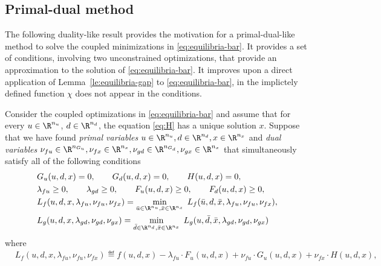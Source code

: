 \documentclass[11pt]{article}
\begin{document}
\subsection{Primal-dual method}

The following duality-like result provides the motivation for a
primal-dual-like method to solve the coupled minimizations in
\eqref{eq:equilibria-bar}. It provides a set of conditions, involving
two unconstrained optimizations, that provide an approximation to the
solution of \eqref{eq:equilibria-bar}. It improves upon a direct
application of Lemma~\ref{le:equilibria-gap} to
\eqref{eq:equilibria-bar}, in the implictely defined function $\chi$ does
not appear in the conditions.



\begin{corollary}\label{co:equilibria-gap}
  Consider the coupled optimizations in \eqref{eq:equilibria-bar} and
  assume that for every $u\in\R^{n_u}$, $d\in\R^{n_d}$, the equation
  \eqref{eq:H} has a unique solution $x$.  Suppose that we have found
  \emph{primal variables} $u\in\R^{n_u},d\in\R^{n_d},
  x\in\R^{n_x}$ and \emph{dual variables}
  $\nu_{fu}\in\R^{n_{G_u}},\nu_{fx}\in\R^{n_x},\nu_{gd}\in\R^{n_{G_d}},\nu_{gx}\in\R^{n_x}$
  that simultaneously satisfy all of the following conditions
  \begin{subequations}
    \begin{align}
      \label{eq:equality-constraints-ud-latent}
      &G_u(u,d,x)=0, \qquad
      G_d(u,d,x)=0, \qquad H(u,d,x)=0, \\
      \label{eq:inequality-constraints-ud-latent}
      &\lambda_{fu}\ge0, \qquad \lambda_{gd} \ge 0, \qquad F_u(u,d,x)\ge0,
      \qquad F_d(u,d,x)\ge0,\\
      \label{eq:central-points-ud-latent-1}
      &L_f(u,d,x,\lambda_{fu},\nu_{fu},\nu_{fx})
      =\min_{\bar u\in\R^{n_u},\bar x\in\R^{n_x}}\; L_f(\bar u,d,\bar x,\lambda_{fu},\nu_{fu},\nu_{fx}), \\
      \label{eq:central-points-ud-latent-2}
      &L_g(u,d,x,\lambda_{gd},\nu_{gd},\nu_{gx})
      =\min_{\bar d\in\R^{n_d},\bar x\in\R^{n_x}}\; L_g(u,\bar d,\bar x,\lambda_{gd},\nu_{gd},\nu_{gx})
    \end{align}
  \end{subequations}
  where 
  \begin{align*}
    &L_f(u,d,x,\lambda_{fu},\nu_{fu},\nu_{fx})\eqdef f(u,d,x)-\lambda_{fu}\cdot F_u(u,d,x)+\nu_{fu}\cdot G_u(u,d,x)+\nu_{fx}\cdot H(u,d,x), \\

\end{align*}
\end{corollary}
\end{document}
